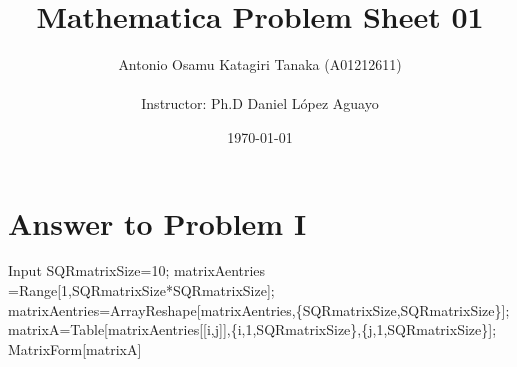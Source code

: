 \documentclass[11pt,a4paper]{article}
\title
{
    Mathematica Problem Sheet 01
}
\author
{    
    Antonio Osamu Katagiri Tanaka (A01212611) \\
    \\
    Instructor: Ph.D Daniel L{\' o}pez Aguayo
}
\date{\today}
\providecommand{\keywords}[1]
{
    \\
    \\
    \small
    \textbf{\textit{Keywords:}} #1
}
\begin{document}
\setlength\parindent{0pt} %


\maketitle


\clearpage








\section{Answer to Problem I}\label{sec:P01}

\begin{mmaCell}[moredefined={SQRmatrixSize, matrixAentries, matrixA, \
i, j}]{Input}
SQRmatrixSize=10;
matrixAentries =Range[1,SQRmatrixSize*SQRmatrixSize];
matrixAentries=ArrayReshape[matrixAentries,\{SQRmatrixSize,SQRmatrixSize\}];
matrixA=Table[matrixAentries[[i,j]],\{i,1,SQRmatrixSize\},\{j,1,SQRmatrixSize\}];
MatrixForm[matrixA]
\end{mmaCell}
\end{document}
